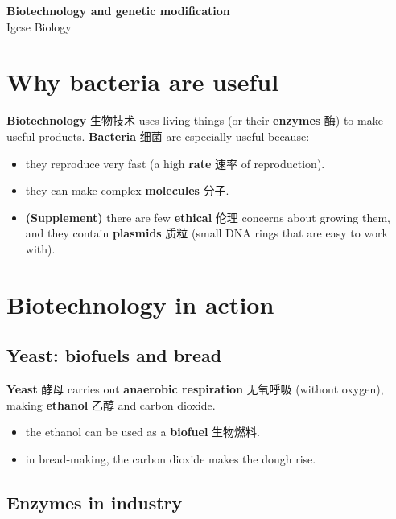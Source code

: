 \documentclass[11pt]{article}
\begin{document}
\begin{center}
  {\LARGE\bfseries Biotechnology and genetic modification}\\[0.35em]
  {\large Igcse Biology}
\end{center}
\vspace{0.6em}

\section*{Why bacteria are useful}

\textbf{Biotechnology} 生物技术 uses living things (or their \textbf{enzymes} 酶) to make useful products. \textbf{Bacteria} 细菌 are especially useful because:

\begin{itemize}
\item they reproduce very fast (a high \textbf{rate} 速率 of reproduction).

\item they can make complex \textbf{molecules} 分子.

\item \textbf{(Supplement)} there are few \textbf{ethical} 伦理 concerns about growing them, and they contain \textbf{plasmids} 质粒 (small DNA rings that are easy to work with).

\end{itemize}

\section*{Biotechnology in action}

\subsection*{Yeast: biofuels and bread}

\textbf{Yeast} 酵母 carries out \textbf{anaerobic respiration} 无氧呼吸 (without oxygen), making \textbf{ethanol} 乙醇 and carbon dioxide.

\begin{itemize}
\item the ethanol can be used as a \textbf{biofuel} 生物燃料.

\item in bread-making, the carbon dioxide makes the dough rise.

\end{itemize}

\subsection*{Enzymes in industry}
\end{document}
